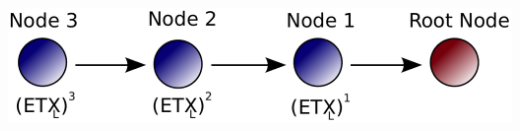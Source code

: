 \documentclass{beamer}
\begin{document}
\begin{frame}[fragile]
  \footnotesize{
    \begin{block}{}
        \includegraphics[width=\textwidth]{Images/non-linear}
    \end{block}
  }
\end{frame}
\end{document}
